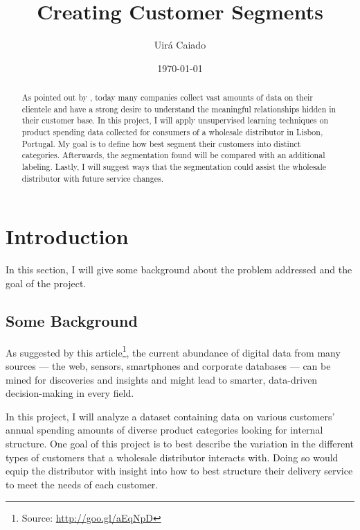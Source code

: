 \documentclass[a4paper]{article}
\title{Creating Customer Segments}
\author{Uirá Caiado}
\date{\today}
\begin{document}
\maketitle

\begin{abstract}
As pointed out by \cite{Udacity}, today many companies collect vast amounts of data on their clientele and have a strong desire to understand the meaningful relationships hidden in their customer base. In this project, I will apply unsupervised learning techniques on product spending data collected for consumers of a wholesale distributor in Lisbon, Portugal. My goal is to define how best segment their customers into distinct categories. Afterwards, the segmentation found will be compared with an additional labeling. Lastly, I will suggest ways that the segmentation could assist the wholesale distributor with future service changes.
\end{abstract}


\section{Introduction}
\label{sec:introduction}
In this section, I will give some background about the problem addressed and the goal of the project.

\subsection{Some Background}
As suggested by this article\footnote{Source: \url{http://goo.gl/aEqNpD}}, the current abundance of digital data from many sources — the web, sensors, smartphones and corporate databases — can be mined for discoveries and insights and might lead to smarter, data-driven decision-making in every field.

In this project, I will analyze a dataset containing data on various customers' annual spending amounts of diverse product categories looking for internal structure. One goal of this project is to best describe the variation in the different types of customers that a wholesale distributor interacts with. Doing so would equip the distributor with insight into how to best structure their delivery service to meet the needs of each customer.
\end{document}
